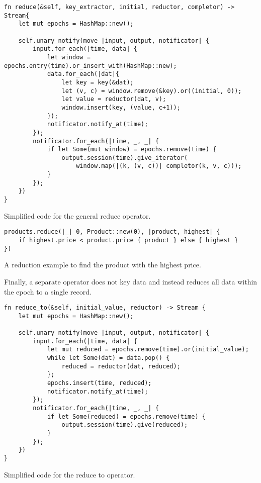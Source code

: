 \begin{listing}[H]
\begin{verbatim}
fn reduce(&self, key_extractor, initial, reductor, completor) -> Stream{
    let mut epochs = HashMap::new();

    self.unary_notify(move |input, output, notificator| {
        input.for_each(|time, data| {
            let window = epochs.entry(time).or_insert_with(HashMap::new);
            data.for_each(|dat|{
                let key = key(&dat);
                let (v, c) = window.remove(&key).or((initial, 0));
                let value = reductor(dat, v);
                window.insert(key, (value, c+1));
            });
            notificator.notify_at(time);
        });
        notificator.for_each(|time, _, _| {
            if let Some(mut window) = epochs.remove(time) {
                output.session(time).give_iterator(
                    window.map(|(k, (v, c))| completor(k, v, c)));
            }
        });
    })
}
\end{verbatim}
  \caption{Simplified code for the general reduce operator.}
  \label{lst:reduce}
\end{listing}

\begin{listing}[H]
\begin{verbatim}
products.reduce(|_| 0, Product::new(0), |product, highest| {
    if highest.price < product.price { product } else { highest }
})
\end{verbatim}
\caption{A reduction example to find the product with the highest price.}
\label{lst:reduce-example}
\end{listing}

Finally, a separate  operator does not key data and instead reduces all data within the epoch to a single record.

\begin{listing}[H]
\begin{verbatim}
fn reduce_to(&self, initial_value, reductor) -> Stream {
    let mut epochs = HashMap::new();
    
    self.unary_notify(move |input, output, notificator| {
        input.for_each(|time, data| {
            let mut reduced = epochs.remove(time).or(initial_value);
            while let Some(dat) = data.pop() {
                reduced = reductor(dat, reduced);
            };
            epochs.insert(time, reduced);
            notificator.notify_at(time);
        });
        notificator.for_each(|time, _, _| {
            if let Some(reduced) = epochs.remove(time) {
                output.session(time).give(reduced);
            }
        });
    })
}
\end{verbatim}
  \caption{Simplified code for the reduce to operator.}
  \label{lst:reduce-to}
\end{listing}

